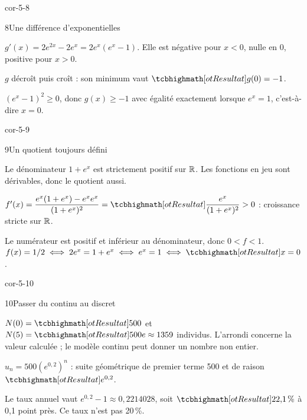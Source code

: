 \begin{blocLivre}{cor-5-8}
\begin{corrige}{8}{Une différence d'exponentielles}
\begin{questions}
\item $g'(x)=2e^{2x}-2e^x=2e^x(e^x-1)$.
Elle est négative pour $x<0$, nulle en 0, positive pour $x>0$.
\item $g$ décroît puis croît : son minimum vaut $\res{g(0)=-1}$.
\item $(e^x-1)^2\geq0$, donc $g(x)\geq-1$ avec égalité exactement lorsque $e^x=1$,
c'est-à-dire $x=0$.
\end{questions}
\label{figlivre-r05-08-var-cor}

\end{corrige}
\end{blocLivre}
\begin{blocLivre}{cor-5-9}
\begin{corrige}{9}{Un quotient toujours défini}
\begin{questions}
\item Le dénominateur $1+e^x$ est strictement positif sur $\mathbb{R}$.
Les fonctions en jeu sont dérivables, donc le quotient aussi.
\item $f'(x)=\dfrac{e^x(1+e^x)-e^xe^x}{(1+e^x)^2}
=\res{\dfrac{e^x}{(1+e^x)^2}}>0$ : croissance stricte sur $\mathbb{R}$.
\item Le numérateur est positif et inférieur au dénominateur, donc $0<f<1$.
$f(x)=1/2\iff2e^x=1+e^x\iff e^x=1\iff\res{x=0}$.
\end{questions}
\end{corrige}
\end{blocLivre}
\begin{blocLivre}{cor-5-10}
\begin{corrige}{10}{Passer du continu au discret}
\begin{questions}
\item $N(0)=\res{500}$ et $N(5)=\res{500e\approx1359}$ individus.
L'arrondi concerne la valeur calculée ; le modèle continu peut donner un nombre non entier.
\item $u_n=500(e^{0{,}2})^n$ : suite géométrique de premier terme 500 et
de raison $\res{e^{0{,}2}}$.
\item Le taux annuel vaut $e^{0{,}2}-1\approx0{,}2214028$, soit
$\res{22{,}1\,\%}$ à 0,1 point près. Ce taux n'est pas 20\,\%.
\end{questions}
\end{corrige}
\end{blocLivre}
